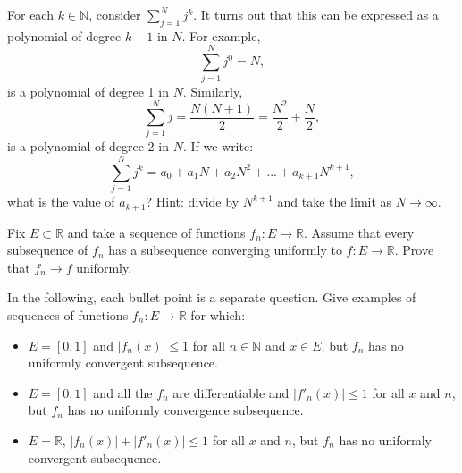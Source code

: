   \begin{exercise}
    For each $k \in \mathbb{N}$, consider $\sum_{j=1}^N j^k$. It turns out that this can be expressed as a polynomial of degree $k + 1$ in $N$. For example,
    \begin{equation}
      \sum_{j=1}^N j^0 = N,
    \end{equation}
    is a polynomial of degree 1 in $N$. Similarly,
    \begin{equation}
      \sum_{j=1}^N j = \frac{N(N + 1)}{2} = \frac{N^2}{2} + \frac{N}{2},
    \end{equation}
    is a polynomial of degree 2 in $N$. If we write:
    \begin{equation}
      \sum_{j=1}^N j^k = a_0 + a_1N + a_2N^2 + ... + a_{k+1}N^{k+1},
    \end{equation}
    what is the value of $a_{k+1}$? Hint: divide by $N^{k+1}$ and take the limit as $N \to \infty$.
  \end{exercise}
  \begin{solution}

  \end{solution}

  \begin{exercise}
    Fix $E \subset \mathbb{R}$ and take a sequence of functions $f_n : E \to \mathbb{R}$. Assume that every subsequence of $f_n$ has a subsequence converging uniformly to $f : E \to \mathbb{R}$. Prove that $f_n \to f$ uniformly.
  \end{exercise}
  \begin{solution}

  \end{solution}

  \begin{exercise}
    In the following, each bullet point is a separate question. Give examples of sequences of functions $f_n : E \to \mathbb{R}$ for which:
    \begin{itemize}
      \item $E = [0, 1]$ and $|f_n(x)| \leq 1$ for all $n \in \mathbb{N}$ and $x \in E$, but $f_n$ has no uniformly convergent subsequence.
      \item $E = [0, 1]$ and all the $f_n$ are differentiable and $|f'_n(x)| \leq 1$ for all $x$ and $n$, but $f_n$ has no uniformly convergence subsequence.
      \item $E = \mathbb{R}$, $|f_n(x)|+|f'_n(x)| \leq 1$ for all $x$ and $n$, but $f_n$ has no uniformly convergent subsequence.
    \end{itemize}
  \end{exercise}
  \begin{solution}

  \end{solution}


